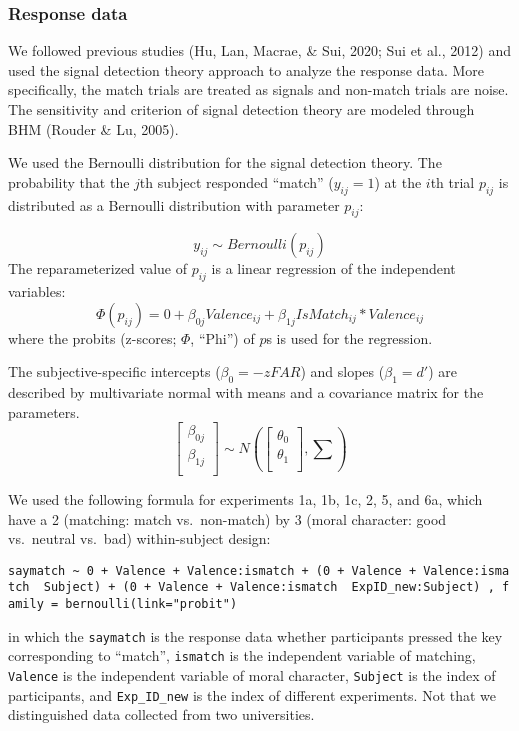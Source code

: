 \documentclass[
  man]{apa6}
\begin{document}
\hypertarget{response-data}{%
\subsubsection{Response data}\label{response-data}}

We followed previous studies (Hu, Lan, Macrae, \& Sui, 2020; Sui et al., 2012) and used the signal detection theory approach to analyze the response data. More specifically, the match trials are treated as signals and non-match trials are noise. The sensitivity and criterion of signal detection theory are modeled through BHM (Rouder \& Lu, 2005).

We used the Bernoulli distribution for the signal detection theory. The probability that the \(j\)th subject responded ``match'' (\(y_{ij} = 1\)) at the \(i\)th trial \(p_{ij}\) is distributed as a Bernoulli distribution with parameter \(p_{ij}\):

\[ y_{ij} \sim Bernoulli(p_{ij})\]
The reparameterized value of \(p_{ij}\) is a linear regression of the independent variables:
\[ \Phi(p_{ij}) = 0 + \beta_{0j}Valence_{ij} + \beta_{1j}IsMatch_{ij} * Valence_{ij}\]
where the probits (z-scores; \(\Phi\), ``Phi'') of \(p\)s is used for the regression.

The subjective-specific intercepts (\(\beta_{0} = -zFAR\)) and slopes (\(\beta_{1} = d'\)) are described by multivariate normal with means and a covariance matrix for the parameters.
\[ \begin{bmatrix}\beta_{0j}\\
\beta_{1j}\\
\end{bmatrix} \sim N(\begin{bmatrix}\theta_{0}\\
\theta_{1}\\
\end{bmatrix}, \sum) \]

We used the following formula for experiments 1a, 1b, 1c, 2, 5, and 6a, which have a 2 (matching: match vs.~non-match) by 3 (moral character: good vs.~neutral vs.~bad) within-subject design:

\texttt{saymatch\ \textasciitilde{}\ 0\ +\ Valence\ +\ Valence:ismatch\ +\ (0\ +\ Valence\ +\ Valence:ismatch\ \textbar{}\ Subject)\ +\ (0\ +\ Valence\ +\ Valence:ismatch\ \textbar{}\ ExpID\_new:Subject)\ ,\ family\ =\ bernoulli(link="probit")}

in which the \texttt{saymatch} is the response data whether participants pressed the key corresponding to ``match'', \texttt{ismatch} is the independent variable of matching, \texttt{Valence} is the independent variable of moral character, \texttt{Subject} is the index of participants, and \texttt{Exp\_ID\_new} is the index of different experiments. Not that we distinguished data collected from two universities.
\end{document}
